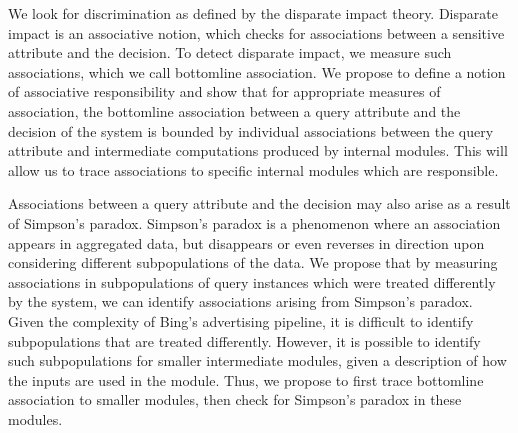 \documentclass[10pt, onecolumn]{report}
\begin{document}
We look for discrimination as defined by the disparate impact theory. Disparate impact
is an associative notion, which checks for associations between a sensitive attribute
and the decision. To detect disparate impact, we measure such associations, which we call
bottomline association. 
We propose to define a notion of associative responsibility and show 
that for appropriate measures of association, 
the bottomline association between a query attribute and the decision of 
the system is bounded by individual associations between the query attribute
and intermediate computations produced by internal modules. 
This will allow us to trace associations to specific internal modules which are responsible.

Associations between a query attribute and the decision may also arise
as a result of Simpson's paradox. Simpson's paradox is a phenomenon 
where an association appears in aggregated data, but disappears 
or even reverses in direction upon considering different subpopulations of the data.
We propose that by measuring associations in 
subpopulations of query instances which were treated differently by the system, 
we can identify associations arising from Simpson's paradox. 
Given the complexity of Bing's advertising pipeline, it is difficult to identify
subpopulations that are treated differently. However, it is possible to identify 
such subpopulations for smaller intermediate modules, given a 
description of how the inputs are used in the module. Thus, we propose to first 
trace bottomline association to smaller modules, then check for Simpson's
paradox in these modules.
\end{document}
